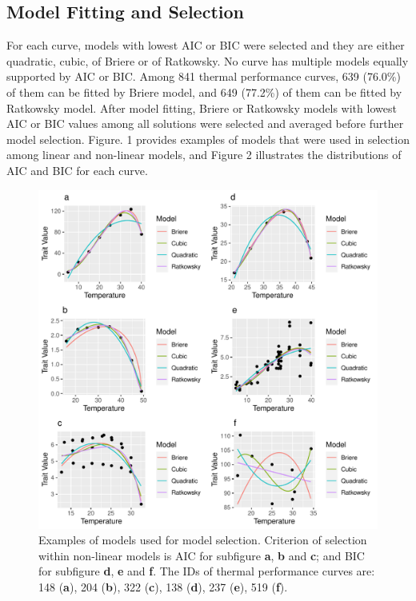 \documentclass[11pt]{article}
\begin{document}
    \subsection{Model Fitting and Selection}
    For each curve, models with lowest AIC or BIC were selected and they are either quadratic, 
    cubic, of Briere or of Ratkowsky. No curve has multiple models equally supported by AIC or BIC. 
    Among 841 thermal performance curves, 639 (76.0\%) of them can be fitted by Briere model, and 649 (77.2\%) of them can 
    be fitted by Ratkowsky model. After model fitting, Briere or Ratkowsky models with lowest AIC or BIC 
    values among all solutions 
    were selected and averaged before further model selection. 
    Figure. 1 provides examples of models that were used in selection among linear and non-linear models, and Figure 2 
    illustrates the distributions of AIC and BIC for each curve.
    \begin{figure}[H]
      \centering
      \includegraphics[width=\textwidth]{../Results/Fig1.pdf}
      \caption{Examples of models used for model selection. Criterion of selection within non-linear models is AIC for 
      subfigure \textbf{a}, \textbf{b} and \textbf{c}; and BIC for subfigure \textbf{d}, \textbf{e} and \textbf{f}. 
      The IDs of thermal performance curves 
      are: 148 (\textbf{a}), 204 (\textbf{b}), 322 (\textbf{c}), 138 (\textbf{d}), 237 (\textbf{e}),
      519 (\textbf{f}).}
    \end{figure}
\end{document}

